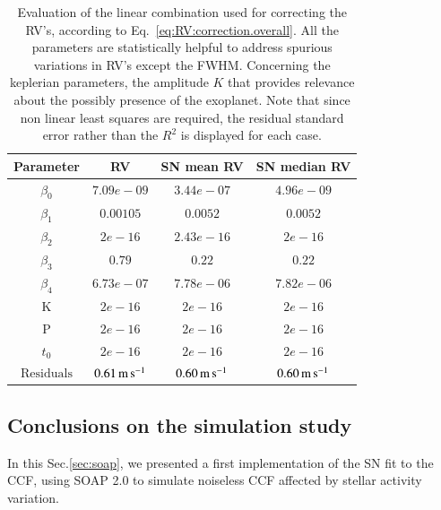 \documentclass{aa}
\def\ms{\hbox{\,m\,s$^{-1}$}}         %
\begin{document}
\begin{table}
\centering
\begin{tabular}{|c|c|c|c|}
\hline
Parameter          & RV         &   SN mean RV &   SN median RV \\
\hline
$\beta_{0}$            &    $7.09e-09$    & $ 3.44e-07$  & $4.96e-09$ \\
\hline
$\beta_{1}$            &    $0.00105$    & $0.0052$  & $0.0052$ \\
\hline
$\beta_{2}$            &     $2e-16$   & $2.43e-16$ & $2e-16$\\
\hline
$\beta_{3}$            &     $0.79$   &  $0.22$  & $0.22$\\
\hline
$\beta_{4}$            &     $6.73e-07$   &  $7.78e-06$ & $7.82e-06$\\
\hline
K            &     $2e-16$   &  $2e-16$   & $ 2e-16 $\\
\hline
P            &     $2e-16$   &  $2e-16$ & $2e-16 $\\
\hline
$t_{0}$            &     $2e-16$   &  $2e-16$ & $2e-16 $\\
\hline
$\text{Residuals}$      &     $0.61 \ms$    &  $ 0.60 \ms$ & $0.60 \ms$  \\
\hline
\end{tabular}
\caption{Evaluation of the linear combination used for correcting the RV's, according to Eq.~\ref{eq:RV:correction.overall}. All the parameters are statistically helpful to address spurious variations in RV's except the FWHM. Concerning the keplerian parameters, the amplitude $K$ that provides relevance about the possibly presence of the exoplanet. Note that since non linear least squares are required, the residual standard error rather than the $R^2$ is displayed for each case.}
\label{table:spotplanet.test}
\end{table}

\subsection{Conclusions on the simulation study} \label{sec:soap.conclusions}

In this Sec.\ref{sec:soap}, we presented a first implementation of the SN fit to the CCF, using SOAP 2.0 to simulate noiseless CCF affected by stellar activity variation. 
\end{document}

